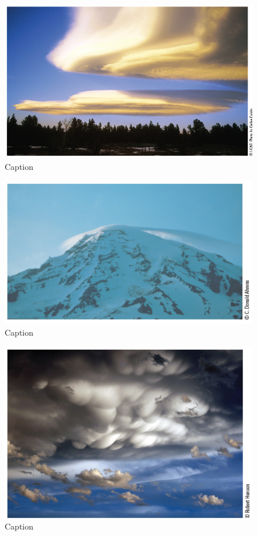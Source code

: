 \documentclass[12pt,oneside]{book}
\begin{document}
\begin{figure}

{\centering \includegraphics[width=0.8\linewidth]{figures/Figure258} 

}

\caption{Caption}\label{fig:CLOUD12}
\end{figure}

\begin{figure}

{\centering \includegraphics[width=0.8\linewidth]{figures/Figure259} 

}

\caption{Caption}\label{fig:CLOUD13}
\end{figure}

\begin{figure}

{\centering \includegraphics[width=0.8\linewidth]{figures/Figure260} 

}

\caption{Caption}\label{fig:CLOUD14}
\end{figure}
\end{document}
